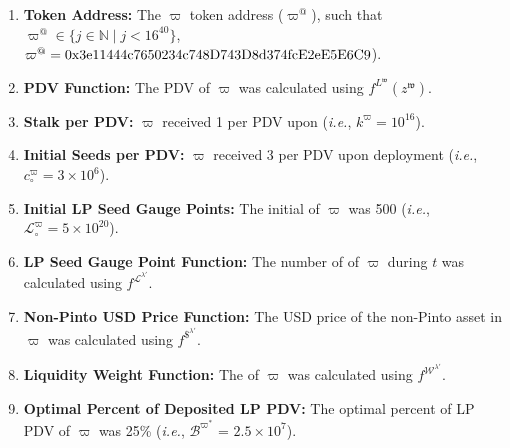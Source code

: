 \documentclass[class=article, crop=false]{standalone}
\begin{document}
\begin{enumerate}

    \item \textbf{Token Address:} The $\varpi$ token address ($\varpi^{@}$), such that $\varpi^{@} \in \{j \in \mathbb{N} \mid j < 16^{40} \}$, $\varpi^{@} = \\ \text{0x3e11444c7650234c748D743D8d374fcE2eE5E6C9}$).
    
    \item \textbf{PDV Function:} The PDV of $\varpi$ was calculated using $f^{L^{\mathfrak{w}}}(z^{\mathfrak{w}})$.
                
    \item \textbf{Stalk per PDV:} $\varpi$  received 1  per PDV upon  (\textit{i.e.}, $k^{\varpi} = 10^{16}$).
    
    \item \textbf{Initial Seeds per PDV:} $\varpi$  received 3  per PDV upon deployment (\textit{i.e.}, ${c_{\circ}^{\varpi}} = 3 \times 10^6$).

    \item \textbf{Initial LP Seed Gauge Points:} The initial  of $\varpi$ was 500 (\textit{i.e.}, $\mathscr{L}_{\circ}^{\varpi} = 5 \times 10^{20}$).
    
    \item \textbf{LP Seed Gauge Point Function:} The number of  of $\varpi$ during $t$ was calculated using $f^{\mathscr{L}^{\lambda'}}$.

    \item \textbf{Non-Pinto USD Price Function:} The USD price of the non-Pinto asset in $\varpi$ was calculated using $f^{\$^{\lambda'}}$.

    \item \textbf{Liquidity Weight Function:} The  of $\varpi$ was calculated using $f^{\mathscr{W}^{\lambda'}}$.
    
    \item \textbf{Optimal Percent of Deposited LP PDV:} The optimal percent of  LP PDV of $\varpi$ was 25\% (\textit{i.e.}, $\mathscr{B}^{\varpi^{*}}$ = $2.5 \times 10^{7}$).


\end{enumerate}
\end{document}
